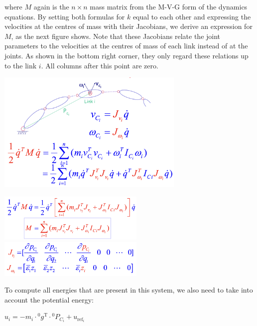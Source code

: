 where $M$ again is the $n\times n$ mass matrix from the M-V-G form of the dynamics equations. By setting both formulas for $k$ equal to each other and expressing the velocities at the centres of mass with their Jacobians, we derive an expression for $M$, as the next figure shows. Note that these Jacobians relate the joint parameters to the velocities at the centres of mass of each link instead of at the joints. As shown in the bottom right corner, they only regard these relations up to the link $i$. All columns after this point are zero.
\\

\begin{minipage}[c]{0.5\textwidth}
	\includegraphics[width=9cm]{sections/imgs/6_mass_matrix_jacobian.png}
\end{minipage}
\hfill
\begin{minipage}[c]{0.5\textwidth}
\begin{center}
	\includegraphics[width=7cm]{sections/imgs/6_mass_matrix_jacobian_2.png}
	\vfill
	\includegraphics[width=7cm]{sections/imgs/6_mass_matrix_jacobian_3.png}
\end{center}
\end{minipage}

To compute all energies that are present in this system, we also need to take into account the potential energy:

\begin{center}
	$u_{i}=-m_{i} \cdot{ }^{0} g^{\mathrm{T}} \cdot{ }^{0} P_{C_{i}}+u_{\mathrm{ref}_{i}}$
\end{center}

